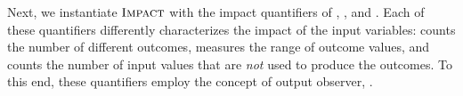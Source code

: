 Next, we instantiate $\textup{\textsc{Impact}}$ with the impact quantifiers of \outcomesname{}, \rangename{}, and \qusedname{}. Each of these quantifiers differently characterizes the impact of the input variables: \outcomesname{} counts the number of different outcomes, \rangename{} measures the range of outcome values, and \qusedname{} counts the number of input values that are \emph{not} used to produce the outcomes.
To this end, these quantifiers employ the concept of output observer, \cf{} .



